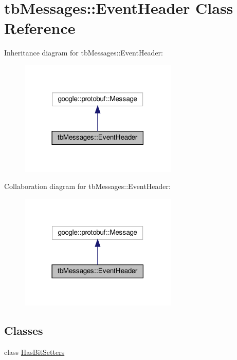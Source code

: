 \hypertarget{classtbMessages_1_1EventHeader}{}\section{tb\+Messages\+:\+:Event\+Header Class Reference}
\label{classtbMessages_1_1EventHeader}


Inheritance diagram for tb\+Messages\+:\+:Event\+Header\+:
\nopagebreak
\begin{figure}[H]
\begin{center}
\leavevmode
\includegraphics[width=213pt]{classtbMessages_1_1EventHeader__inherit__graph}
\end{center}
\end{figure}


Collaboration diagram for tb\+Messages\+:\+:Event\+Header\+:
\nopagebreak
\begin{figure}[H]
\begin{center}
\leavevmode
\includegraphics[width=213pt]{classtbMessages_1_1EventHeader__coll__graph}
\end{center}
\end{figure}
\subsection*{Classes}
\begin{DoxyCompactItemize}
\item 
class \hyperlink{classtbMessages_1_1EventHeader_1_1HasBitSetters}{Has\+Bit\+Setters}
\end{DoxyCompactItemize}
